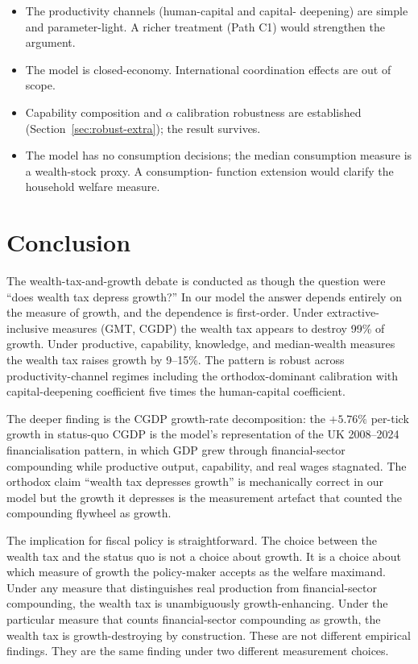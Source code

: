 \documentclass[11pt]{article}
\begin{document}
\begin{itemize}
\item The productivity channels (human-capital and capital-
deepening) are simple and parameter-light.  A richer treatment
(Path C1) would strengthen the argument.
\item The model is closed-economy.  International coordination
effects are out of scope.
\item Capability composition and $\alpha$ calibration robustness are
established (Section~\ref{sec:robust-extra}); the result survives.
\item The model has no consumption decisions; the median
consumption measure is a wealth-stock proxy.  A consumption-
function extension would clarify the household welfare measure.
\end{itemize}

\section{Conclusion}
\label{sec:conclusion}

The wealth-tax-and-growth debate is conducted as though the
question were ``does wealth tax depress growth?''  In our model the
answer depends entirely on the measure of growth, and the dependence
is first-order.  Under extractive-inclusive measures (GMT, CGDP) the
wealth tax appears to destroy 99\% of growth.  Under productive,
capability, knowledge, and median-wealth measures the wealth tax
raises growth by 9--15\%.  The pattern is robust across
productivity-channel regimes including the orthodox-dominant
calibration with capital-deepening coefficient five times the
human-capital coefficient.

The deeper finding is the CGDP growth-rate decomposition: the
$+5.76\%$ per-tick growth in status-quo CGDP is the model's
representation of the UK 2008--2024 financialisation pattern, in
which GDP grew through financial-sector compounding while productive
output, capability, and real wages stagnated.  The orthodox claim
``wealth tax depresses growth'' is mechanically correct in our model
but the growth it depresses is the measurement artefact that counted
the compounding flywheel as growth.

The implication for fiscal policy is straightforward.  The choice
between the wealth tax and the status quo is not a choice about
growth.  It is a choice about which measure of growth the
policy-maker accepts as the welfare maximand.  Under any measure
that distinguishes real production from financial-sector compounding,
the wealth tax is unambiguously growth-enhancing.  Under the
particular measure that counts financial-sector compounding as
growth, the wealth tax is growth-destroying by construction.  These
are not different empirical findings.  They are the same finding
under two different measurement choices.
\end{document}
